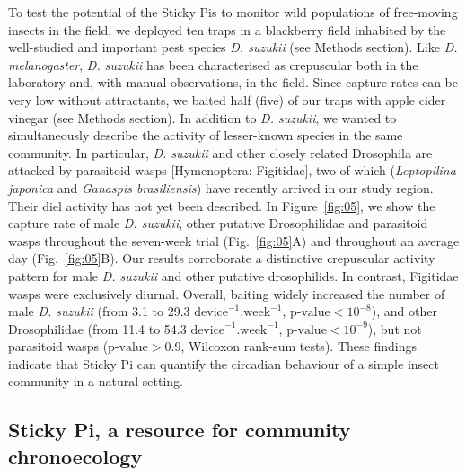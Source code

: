 \documentclass[12pt]{article}
\begin{document}
\begin{linenumbers}
		To test the potential of the Sticky Pis to monitor wild populations of free-moving insects in the field, we deployed ten traps in a blackberry field inhabited by the well-studied and important pest species \emph{D. suzukii} (see Methods section). Like \emph{D. melanogaster}, \emph{D. suzukii} has been characterised as crepuscular both in the laboratory\cite{shaw_control_2019} and, with manual observations, in the field\cite{swoboda-bhattarai_diurnal_2020}. Since capture rates can be very low without attractants\cite{swoboda-bhattarai_diurnal_2020}, we baited half (five) of our traps with apple cider vinegar (see Methods section). In addition to \emph{D. suzukii}, we wanted to simultaneously describe the activity of lesser-known species in the same community. In particular, \emph{D. suzukii} and other closely related Drosophila are attacked by parasitoid wasps [Hymenoptera: Figitidae], two of which (\emph{Leptopilina japonica} and \emph{Ganaspis brasiliensis}) have recently arrived in our study region\cite{abram_new_2020}. Their diel activity has not yet been described. In Figure~\ref{fig:05}, we show the capture rate of male \emph{D. suzukii}, other putative Drosophilidae and parasitoid wasps throughout the seven-week trial (Fig.~\ref{fig:05}A) and throughout an average day (Fig.~\ref{fig:05}B). Our results corroborate a distinctive crepuscular activity pattern for male \emph{D. suzukii} and other putative drosophilids. In contrast, Figitidae wasps were exclusively diurnal. Overall, baiting widely increased the number of male \emph{D. suzukii} (from 3.1 to 29.3 $\text{device}^{-1}.\text{week}^{-1}$, $\text{p-value} < 10^{-8}$), and other Drosophilidae (from 11.4 to 54.3 $\text{device}^{-1}.\text{week}^{-1}$, $\text{p-value} < 10^{-9}$), but not parasitoid wasps ($\text{p-value} > 0.9$, Wilcoxon rank-sum tests). These findings indicate that Sticky Pi can quantify the circadian behaviour of a simple insect community in a natural setting.

		\subsection*{Sticky Pi, a resource for community chronoecology}


\end{linenumbers}
\end{document}
